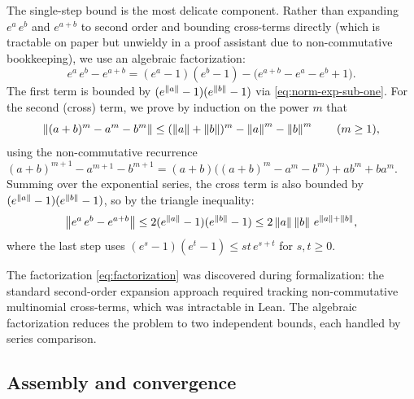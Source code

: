 The single-step bound is the most delicate component. Rather than expanding
$e^a\,e^b$ and $e^{a+b}$ to second order and bounding cross-terms directly
(which is tractable on paper but unwieldy in a proof assistant due to
non-commutative bookkeeping), we use an algebraic factorization:
\begin{equation}\label{eq:factorization}
  e^a\,e^b - e^{a+b}
    = (e^a - 1)(e^b - 1) - \bigl(e^{a+b} - e^a - e^b + 1\bigr).
\end{equation}
The first term is bounded by $(e^{\left\|a\right\|}-1)(e^{\left\|b\right\|}-1)$ via
\eqref{eq:norm-exp-sub-one}. For the second (cross) term, we prove by
induction on the power $m$ that
\begin{equation}\label{eq:cross-term}
  \left\|(a+b)^m - a^m - b^m\right\|
    \le (\left\|a\right\|+\left\|b\right\|)^m - \left\|a\right\|^m - \left\|b\right\|^m
    \qquad (m \ge 1),
\end{equation}
using the non-commutative recurrence
$(a+b)^{m+1} - a^{m+1} - b^{m+1} = (a+b)\bigl((a+b)^m - a^m - b^m\bigr) + ab^m + ba^m$.
Summing over the exponential series, the cross term is also bounded by
$(e^{\left\|a\right\|}-1)(e^{\left\|b\right\|}-1)$, so by the triangle inequality:
\begin{equation}\label{eq:step-bound}
  \left\|e^a\,e^b - e^{a+b}\right\|
    \le 2(e^{\left\|a\right\|}-1)(e^{\left\|b\right\|}-1)
    \le 2\left\|a\right\|\left\|b\right\|\,e^{\left\|a\right\|+\left\|b\right\|},
\end{equation}
where the last step uses $(e^s-1)(e^t-1) \le st\,e^{s+t}$ for $s,t \ge 0$.

\begin{remark}
  The factorization \eqref{eq:factorization} was discovered during
  formalization: the standard second-order expansion approach required
  tracking non-commutative multinomial cross-terms, which was intractable
  in Lean. The algebraic factorization reduces the problem to two
  independent bounds, each handled by series comparison.
\end{remark}

\subsection{Assembly and convergence}
\label{sec:assembly}

